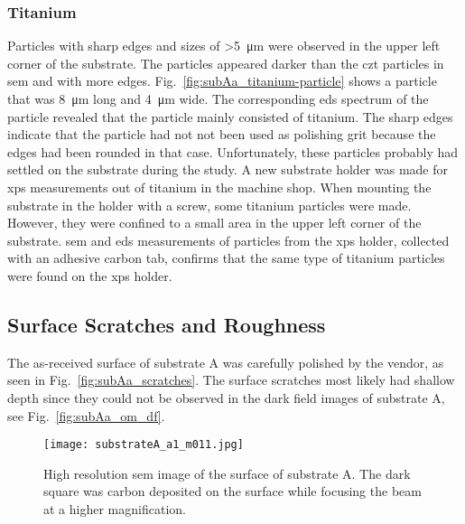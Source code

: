 \subsubsection{Titanium}
Particles with sharp edges and sizes of \SI{>5}{\micro\metre} were observed in the upper left corner of the substrate. The particles appeared darker than the \ac{czt} particles in \ac{sem} and with more edges. Fig.~\ref{fig:subAa_titanium-particle} shows a particle that was \SI{8}{\micro\metre} long and \SI{4}{\micro\metre} wide. The corresponding \ac{eds} spectrum of the particle revealed that the particle mainly consisted of titanium. The sharp edges indicate that the particle had not not been used as polishing grit because the edges had been rounded in that case. Unfortunately, these particles probably had settled on the substrate during the study. A new substrate holder was made for \ac{xps} measurements out of titanium in the machine shop. When mounting the substrate in the holder with a screw, some titanium particles were made. However, they were confined to a small area in the upper left corner of the substrate. \Ac{sem} and \ac{eds} measurements of particles from the \ac{xps} holder, collected with an adhesive carbon tab, confirms that the same type of titanium particles were found on the \ac{xps} holder. %



\subsection{Surface Scratches and Roughness}
The as-received surface of substrate A was carefully polished by the vendor, as seen in Fig.~\ref{fig:subAa_scratches}. The surface scratches most likely had shallow depth since they could not be observed in the dark field images of substrate A, see Fig.~\ref{fig:subAa_om_df}.

\begin{figure}[htbp]
    \centering
    \texttt{[image: substrateA\_a1\_m011.jpg]}
    \caption[\Ac{sem} image of surface scratches on substrate A.]{High resolution \ac{sem} image of the surface of substrate A. The dark square was carbon deposited on the surface while focusing the beam at a higher magnification.}\label{fig:subAa_scratches}
    \label{fig:SEM_A_surface}
\end{figure}

